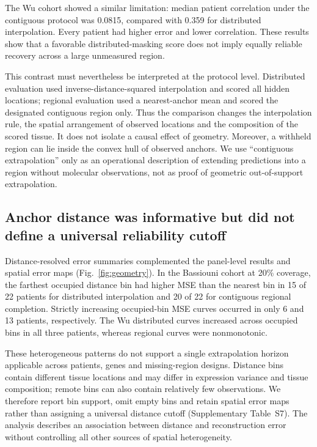The Wu cohort showed a similar limitation: median patient correlation under the contiguous protocol was 0.0815, compared with 0.359 for distributed interpolation. Every patient had higher error and lower correlation. These results show that a favorable distributed-masking score does not imply equally reliable recovery across a large unmeasured region.

This contrast must nevertheless be interpreted at the protocol level. Distributed evaluation used inverse-distance-squared interpolation and scored all hidden locations; regional evaluation used a nearest-anchor mean and scored the designated contiguous region only. Thus the comparison changes the interpolation rule, the spatial arrangement of observed locations and the composition of the scored tissue. It does not isolate a causal effect of geometry. Moreover, a withheld region can lie inside the convex hull of observed anchors. We use ``contiguous extrapolation'' only as an operational description of extending predictions into a region without molecular observations, not as proof of geometric out-of-support extrapolation.

\subsection{Anchor distance was informative but did not define a universal reliability cutoff}
Distance-resolved error summaries complemented the panel-level results and spatial error maps (Fig.~\ref{fig:geometry}). In the Bassiouni cohort at 20\% coverage, the farthest occupied distance bin had higher MSE than the nearest bin in 15 of 22 patients for distributed interpolation and 20 of 22 for contiguous regional completion. Strictly increasing occupied-bin MSE curves occurred in only 6 and 13 patients, respectively. The Wu distributed curves increased across occupied bins in all three patients, whereas regional curves were nonmonotonic.

These heterogeneous patterns do not support a single extrapolation horizon applicable across patients, genes and missing-region designs. Distance bins contain different tissue locations and may differ in expression variance and tissue composition; remote bins can also contain relatively few observations. We therefore report bin support, omit empty bins and retain spatial error maps rather than assigning a universal distance cutoff (Supplementary Table~S7). The analysis describes an association between distance and reconstruction error without controlling all other sources of spatial heterogeneity.

